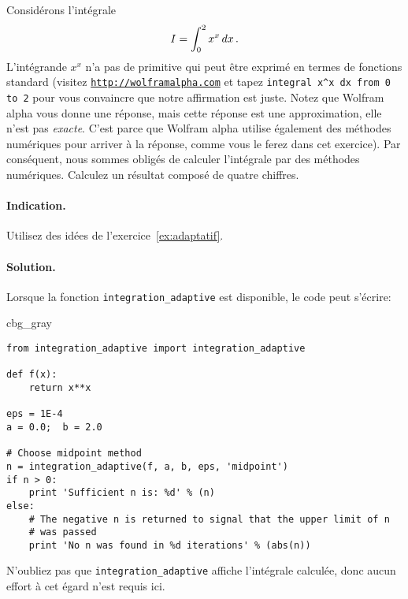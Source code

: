 \documentclass[%
oneside,                 %
final,                   %
10pt,french]{article}
\newenvironment{_cod_tight}[1]{
   \def\FrameCommand{\colorbox{#1}}
   \FrameRule0.6pt\MakeFramed {\FrameRestore}\vskip3mm}
   {\vskip0mm\endMakeFramed}
\newenvironment{cod}[1]{
\bgroup\rmfamily
\fboxsep=0mm\relax
\begin{_cod_tight}{#1}
\list{}{\parsep=-2mm\parskip=0mm\topsep=0pt\leftmargin=2mm
\rightmargin=2\leftmargin\leftmargin=4pt\relax}
\item\relax}
{\endlist\end{_cod_tight}\egroup}
\newenvironment{doconceexercise}{}{}
\newcounter{doconceexercisecounter}
\begin{document}
\begin{doconceexercise}



Considérons l'intégrale
\begin{equation*}
I = \int_0^2 x^x\,dx\thinspace .
\end{equation*}
L'intégrande $x^x$ n'a pas de primitive qui peut être exprimé en termes de fonctions standard (visitez \href{{http://wolframalpha.com}}{\nolinkurl{http://wolframalpha.com}} et tapez \Verb!integral x^x dx from 0 to 2! pour vous convaincre que notre affirmation est juste. Notez que Wolfram alpha vous donne une réponse, mais cette réponse est une approximation, elle n'est pas \emph{exacte}. C'est parce que Wolfram alpha utilise également des méthodes numériques pour arriver à la réponse, comme vous le ferez dans cet exercice). Par conséquent, nous sommes obligés de calculer l'intégrale par des méthodes numériques. Calculez un résultat composé de quatre chiffres.


\paragraph{Indication.}
Utilisez des idées de l'exercice~\ref{ex:adaptatif}.



\paragraph{Solution.}
Lorsque la fonction \Verb!integration_adaptive! est disponible, le code peut s'écrire:
\begin{cod}{cbg_gray}\begin{verbatim}
from integration_adaptive import integration_adaptive

def f(x):
    return x**x

eps = 1E-4
a = 0.0;  b = 2.0

# Choose midpoint method
n = integration_adaptive(f, a, b, eps, 'midpoint')
if n > 0:
    print 'Sufficient n is: %d' % (n)
else:
    # The negative n is returned to signal that the upper limit of n
    # was passed
    print 'No n was found in %d iterations' % (abs(n))
\end{verbatim}
\end{cod}
\noindent
N'oubliez pas que \Verb!integration_adaptive! affiche l'intégrale calculée, donc aucun effort à cet égard n'est requis ici.


\end{doconceexercise}
\end{document}
